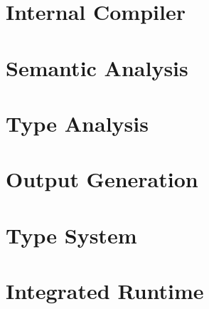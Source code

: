 \section{Internal Compiler}

\section{Semantic Analysis}

\section{Type Analysis}

\section{Output Generation}

\section{Type System}

\section{Integrated Runtime}
